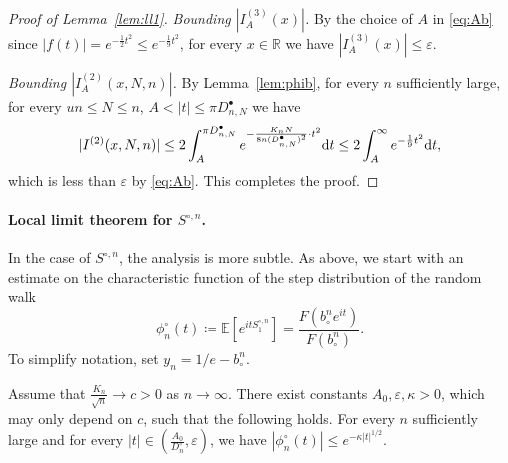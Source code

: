 \documentclass[AHL,XML,longabstracts,Unicode]{cedram}
\newcommand{\R}{\mathbb{R}}
\def\d{{\rm d}}
\def\bcn{b_{\circ}^{n}}
\def\Scn{S^{\circ,n}}
\def\phicn{\phi^{\circ}_{n}}
\def\DbnN{D^{\bullet}_{n,N}}
\def\Dcn{D^{\circ}_{n}}
\renewcommand{\epsilon}{\varepsilon}
\newcommand\Es[1]{\mathbb{E}\left[#1\right]}
\begin{document}
\begin{proof}[Proof of Lemma~\ref{lem:ll1}]
\emph{Bounding $|I^{(3)}_{A}(x)|$.} By the choice of $A$ in \eqref{eq:Ab}
since $|f(t)|=e^{-  \frac{1}{2} t^{2}} \le e^{-  \frac{1}{9} t^{2}}$,
for every $x \in \R$ we have $|I^{(3)}_{A}(x)| \leq \epsilon$.


 \emph{Bounding $|I^{(2)}_{{A} }(x,N,n)|$.}  By Lemma~\ref{lem:phib},  for every $n$ sufficiently large, for every $ un \leq N \leq n$, $A<|t| \leq \pi  \DbnN$ we have
\[|I^{(2)}(x,N,n)| \leq 2 \int_{A}^{\pi \DbnN} e^{-  \frac{ K_{n} N }{ 8 n (\DbnN)^{2}} \cdot t^{2} } {\d}t \leq 2 \int_{A}^{\infty } e^{-  \frac{1}{9} t^{2}} {\d}t,\]
   which is less than $\epsilon$ by \eqref{eq:Ab}. This completes the proof.
\end{proof}





\paragraph*{Local limit theorem for $\Scn$.}

In the case of $\Scn$, the analysis is more subtle.
As above, we start with an estimate on the characteristic function
of the step distribution of the random walk
\[\phicn(t)\coloneqq\Es{e^{it\Scn_{1}}}=\frac{F( \bcn e^{it})}{F(\bcn)}.\]
To simplify notation, set  $y_{n}=1/e-\bcn$.

\begin{lemma}\label{lem:technique}
Assume that $\tfrac{K_{n}}{\sqrt{n}} \rightarrow c>0$ as $n \rightarrow \infty$.  There exist constants $A_{0},\epsilon,\kappa>0$, which may only depend on $c$, such that the following holds.
For every $n$ sufficiently large and for every $|t| \in (\frac{A_{0}}{\Dcn},\epsilon)$, we have $|\phicn(t)| \leq e^{- \kappa |t|^{1/2}}$.
\end{lemma}
\end{document}
